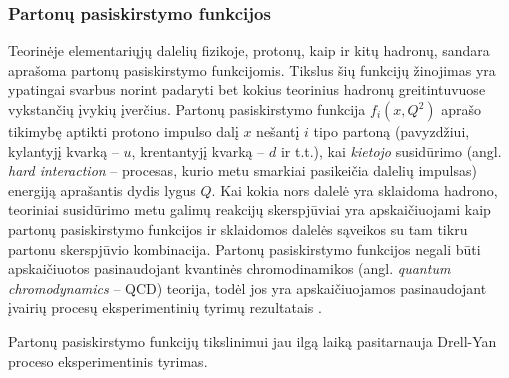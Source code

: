 \documentclass[a4paper, 12pt]{article}
\newlength\q
\begin{document}
\subsubsection{Partonų pasiskirstymo funkcijos}
Teorinėje elementariųjų dalelių fizikoje, protonų, kaip ir kitų hadronų, sandara aprašoma
partonų pasiskirstymo funkcijomis. Tikslus šių funkcijų žinojimas yra ypatingai svarbus
norint padaryti bet kokius teorinius hadronų greitintuvuose vykstančių įvykių įverčius.
Partonų pasiskirstymo funkcija $f_{i}(x, Q^{2})$ aprašo tikimybę aptikti protono impulso
dalį $x$ nešantį $i$ tipo partoną (pavyzdžiui, kylantyjį kvarką -- $u$, krentantyjį
kvarką -- $d$ ir t.t.), kai \textit{kietojo} susidūrimo (angl. \textit{hard interaction} --
procesas, kurio metu smarkiai pasikeičia dalelių impulsas) energiją aprašantis dydis lygus $Q$.
Kai kokia nors dalelė yra sklaidoma hadrono, teoriniai susidūrimo metu galimų reakcijų
skerspjūviai yra apskaičiuojami kaip partonų pasiskirstymo funkcijos ir sklaidomos dalelės
sąveikos su tam tikru partonu skerspjūvio kombinacija.
Partonų pasiskirstymo funkcijos negali būti apskaičiuotos pasinaudojant kvantinės chromodinamikos
(angl. \textit{quantum chromodynamics} -- QCD) teorija, todėl jos yra apskaičiuojamos
pasinaudojant įvairių procesų eksperimentinių tyrimų rezultatais \cite{Placakyte:2011az}.

Partonų pasiskirstymo funkcijų tikslinimui jau ilgą laiką pasitarnauja Drell-Yan proceso eksperimentinis
tyrimas. 
\end{document}
